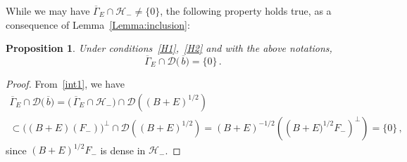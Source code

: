 \documentclass[12pt,reqno]{amsart}
\newtheorem{proposition}[theorem]{Proposition}
\renewcommand{\(}{\left(}
\renewcommand{\)}{\right)}
\begin{document}
While we may have $\overline \Gamma_E\cap \mathcal H_- \ne\{0\}$, the following property holds true, as a consequence of Lemma~\ref{Lemma:inclusion}:
\begin{proposition}\label{Prop:lem2}
Under conditions~\eqref{H1},~\eqref{H2} and with the above notations,
\[
\overline \Gamma_E \cap \mathcal D\big(\,\overline{b}\big)= \{0\}\,.
\]
\end{proposition}
\begin{proof}
From~\eqref{int1}, we have
\begin{multline*}
\overline \Gamma_E \cap \mathcal D\big(\,\overline{b}\big)= \big(\,\overline \Gamma_E \cap \mathcal H_-\big)\cap\mathcal D\((B+E)^{1/2}\)\\
\subset\big((B+E)(F_-)\big)^\perp \cap \mathcal D\((B+E)^{1/2}\)= (B+E)^{-1/2} \(\(B+E)^{1/2} F_-\)^\perp\)= \{0\}\,,
\end{multline*}
since $(B+E)^{1/2}F_-$ is dense in $\mathcal H_-$.
\end{proof}
\end{document}
